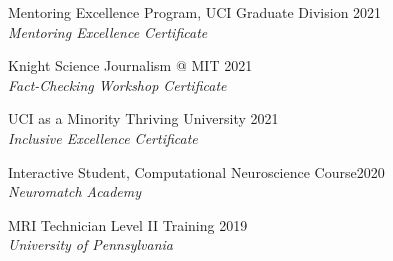 \documentclass[margin, 10pt]{res} %
\begin{document}
\begin{resume}
Mentoring Excellence Program, UCI Graduate Division \hfill 2021 \\
{\sl  Mentoring Excellence Certificate}

Knight Science Journalism @ MIT \hfill 2021 \\
{\sl  Fact-Checking Workshop Certificate}

UCI as a Minority Thriving University \hfill 2021 \\
{\sl Inclusive Excellence Certificate}

Interactive Student, Computational Neuroscience Course\hfill 2020 \\
{\sl Neuromatch Academy}

MRI Technician Level II Training \hfill 2019 \\
{\sl University of Pennsylvania}


\end{resume}
\end{document}
